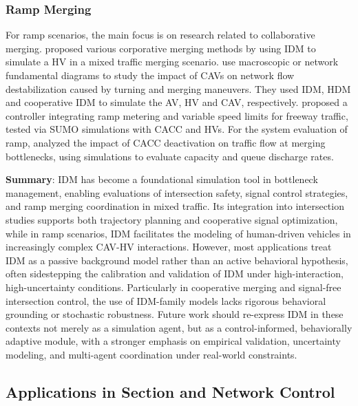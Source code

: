 \documentclass[a4paper,fleqn]{cas-sc}
\begin{document}
\subsubsection{Ramp Merging}

For ramp scenarios, the main focus is on research related to collaborative merging. \cite{baselt_merging_2014,chen_deep_2023,hou_cooperative_2023,ito_coordination_2019,maProgressiveVirtualRiskBasedVehicle2024a,tangNovelHierarchicalCooperativeMerging2022b,xiongManagingMergingCAVLane2022b,zhou_state-constrained_2019} proposed various corporative merging methods by using IDM to simulate a HV in a mixed traffic merging scenario. \cite{guNetworkTrafficInstabilityAutomated2022b} use macroscopic or network fundamental diagrams  to study the impact of CAVs on network flow destabilization caused by turning and merging maneuvers. They used IDM, HDM and cooperative IDM to simulate the AV, HV and CAV, respectively. \cite{silgu_combined_2022}  proposed a controller integrating ramp metering and variable speed limits for freeway traffic, tested via SUMO simulations with CACC and HVs.  For the system evaluation of ramp, \cite{xiaoUnravellingEffectsCooperativeAdaptive2018a} analyzed the impact of CACC deactivation on traffic flow at merging bottlenecks, using simulations to evaluate capacity and queue discharge rates.

\textbf{Summary}: IDM has become a foundational simulation tool in bottleneck management, enabling evaluations of intersection safety, signal control strategies, and ramp merging coordination in mixed traffic. Its integration into intersection studies supports both trajectory planning and cooperative signal optimization, while in ramp scenarios, IDM facilitates the modeling of human-driven vehicles in increasingly complex CAV-HV interactions. However, most applications treat IDM as a passive background model rather than an active behavioral hypothesis, often sidestepping the calibration and validation of IDM under high-interaction, high-uncertainty conditions. Particularly in cooperative merging and signal-free intersection control, the use of IDM-family models lacks rigorous behavioral grounding or stochastic robustness. Future work should re-express IDM in these contexts not merely as a simulation agent, but as a control-informed, behaviorally adaptive module, with a stronger emphasis on empirical validation, uncertainty modeling, and multi-agent coordination under real-world constraints.


\subsection{Applications in Section and Network Control}
\end{document}
